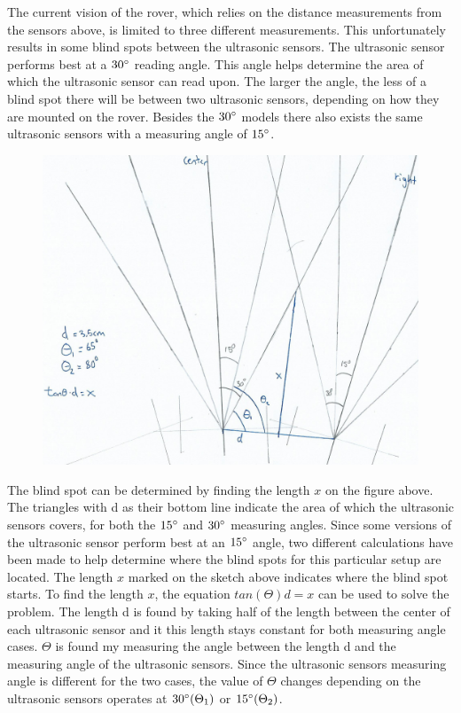 
The current vision of the rover, which relies on the distance measurements from the sensors above, is limited to three different measurements. This unfortunately results in some blind spots between the ultrasonic sensors.
The ultrasonic sensor performs best at a $30\degree$ reading angle. This angle helps determine the area of which the ultrasonic sensor can read upon. The larger the angle, the less of a blind spot there will be between two ultrasonic sensors, depending on how they are mounted on the rover\cite{hcsr40datesheet}. Besides the $30\degree$ models there also exists the same ultrasonic sensors with a measuring angle of $15\degree$.

\clearpage
\begin{figure}[H]
	\centering
	\includegraphics[width=0.8\linewidth]{images/blindspot_calc.jpg}
\end{figure}

The blind spot can be determined by finding the length $x$ on the figure above. The triangles with d as their bottom line indicate the area of which the ultrasonic sensors covers, for both the $15\degree$ and $30\degree$ measuring angles. Since some versions of the ultrasonic sensor perform best at an $15\degree$ angle, two different calculations have been made to help determine where the blind spots for this particular setup are located.
The length $x$ marked on the sketch above indicates where the blind spot starts. To find the length $x$, the equation $tan(\Theta)d = x$ can be used to solve the problem. The length d is found by taking half of the length between the center of each ultrasonic sensor and it this length stays constant for both measuring angle cases. $\Theta$ is found my measuring the angle between the length d and the measuring angle of the ultrasonic sensors. Since the ultrasonic sensors measuring angle is different for the two cases, the value of $\Theta$ changes depending on the ultrasonic sensors operates at $30\degree (\Theta_1)$ or $15\degree (\Theta_2)$.

